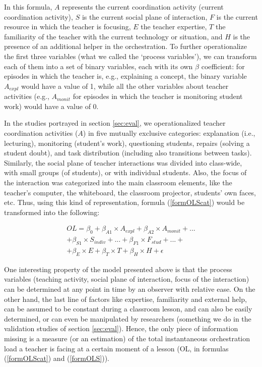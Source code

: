 \documentclass[10pt,journal,compsoc]{IEEEtran}
\begin{document}
In this formula, $A$ represents the current coordination activity (current coordination activity), $S$ is the current social plane of interaction, $F$ is the current resource in which the teacher is focusing, $E$ the teacher expertise, $T$ the familiarity of the teacher with the current technology or situation, and $H$ is the presence of an additional helper in the orchestration. To further operationalize the first three variables (what we called the `process variables'), we can transform each of them into a set of binary variables, each with its own $\beta$ coefficient: for episodes in which the teacher is, e.g., explaining a concept, the binary variable $A_{expl}$ would have a value of 1, while all the other variables about teacher activities (e.g., $A_{monit}$ for episodes in which the teacher is monitoring student work) would have a value of 0. 

In the studies portrayed in section \ref{sec:eval}, we operationalized teacher coordination activities ($A$) in five mutually exclusive categories: explanation (i.e., lecturing), monitoring (student's work), questioning students, repairs (solving a student doubt), and task  distribution (including also transitions between tasks). Similarly, the social plane of teacher interactions was divided into class-wide, with small groups (of students), or with individual students. Also, the focus of the interaction was categorized into the main classroom elements, like the teacher's computer, the whiteboard, the classroom projector, students' own faces, etc. Thus, using this kind of representation, formula (\ref{formOLScat}) would be transformed into the following:

\begin{multline}
\label{formOLS}
OL = \beta_0 + \beta_{A1}\times{}A_{expl} + \beta_{A2}\times{}A_{monit} + ... \\ + \beta_{S1}\times{}S_{indiv} + ... + \beta_{F1}\times{}F_{stud} + ... + \\ + \beta_E\times{}E + \beta_T\times{}T + \beta_H\times{}H + \epsilon
\end{multline}

One interesting property of the model presented above is that the process variables (teaching activity, social plane of interaction, focus of the interaction) can be determined at any point in time by an observer with relative ease. On the other hand, the last line of factors like expertise, familiarity and external help, can be assumed to be constant during a classroom lesson, and can also be easily determined, or can even be manipulated by researchers (something we do in the validation studies of section \ref{sec:eval}). Hence, the only piece of information missing is a measure (or an estimation) of the total instantaneous orchestration load a teacher is facing at a certain moment of a lesson (OL, in formulas (\ref{formOLScat}) and (\ref{formOLS})).
\end{document}
